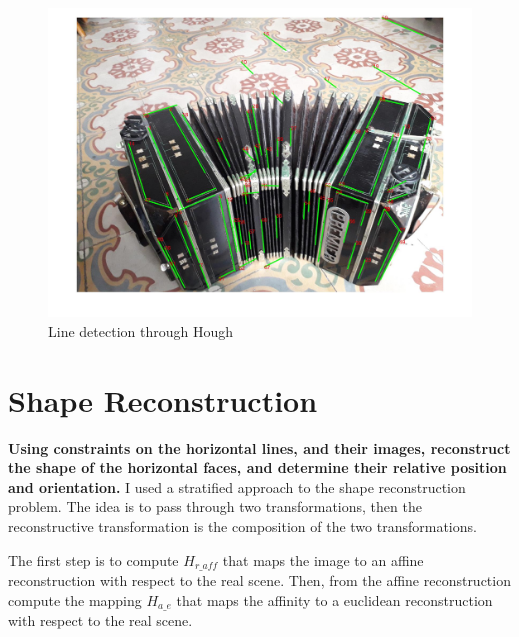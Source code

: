 \documentclass[11pt, oneside]{article}   	%
\begin{document}
\begin{figure}
\includegraphics[width=0.8\linewidth]{lines.jpg}

\caption{Line detection through Hough}
\label{hough}
\end{figure}

\section{Shape Reconstruction}
\textbf{Using constraints on the horizontal lines, and their images, reconstruct the shape of the horizontal faces, and determine their relative position and orientation.} \hfill \break
I used a stratified approach to the shape reconstruction problem. The idea is to pass through two transformations, then the reconstructive transformation is the composition of the two transformations. 


The first step is to compute $H_{r\_aff}$ that maps the image to an affine reconstruction with respect to the real scene. Then, from the affine reconstruction compute the mapping $H_{a\_e}$ that maps the affinity to a euclidean reconstruction with respect to the real scene.
\end{document}

